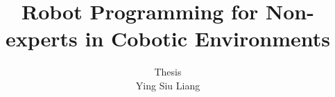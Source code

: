 \title{Robot Programming for Non-experts in Cobotic Environments}
\author{Thesis\\Ying Siu Liang}

%
